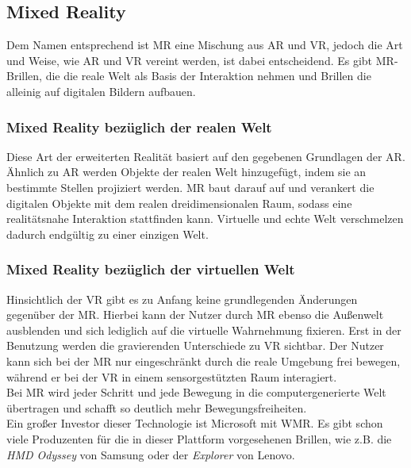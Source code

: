 \subsection*{Mixed Reality}
Dem Namen entsprechend ist \ac{MR} eine Mischung aus \acl{AR} und \acl{VR}, jedoch die Art und Weise, wie \acs{AR} und \acs{VR} vereint 
werden, ist dabei entscheidend. Es gibt \acs{MR}-Brillen, die die reale Welt als Basis der Interaktion nehmen und Brillen die alleinig 
auf digitalen Bildern aufbauen. \cite{mr.2018o}
\subsubsection*{Mixed Reality bezüglich der realen Welt}
Diese Art der erweiterten Realität basiert auf den gegebenen Grundlagen der \acs{AR}. Ähnlich zu \acl{AR} werden Objekte der realen Welt 
hinzugefügt, indem sie an bestimmte Stellen projiziert werden. \acl{MR} baut darauf auf und verankert die digitalen Objekte mit dem realen
dreidimensionalen Raum, sodass eine realitätsnahe Interaktion stattfinden kann. Virtuelle und echte Welt verschmelzen dadurch endgültig zu 
einer einzigen Welt. 

\subsubsection*{Mixed Reality bezüglich der virtuellen Welt}
Hinsichtlich der \acs{VR} gibt es zu Anfang keine grundlegenden Änderungen gegenüber der \acs{MR}. Hierbei kann der Nutzer durch 
\acs{MR} ebenso die Außenwelt ausblenden und sich lediglich auf die virtuelle Wahrnehmung fixieren. Erst in der Benutzung werden die 
gravierenden Unterschiede zu \acs{VR} sichtbar. Der Nutzer kann sich bei der \acs{MR} nur eingeschränkt durch 
die reale Umgebung frei bewegen, während er bei der \acl{VR} in einem sensorgestützten Raum interagiert. \cite{vr.2018n}
\\ 
Bei \acs{MR} wird jeder Schritt und jede Bewegung in die computergenerierte Welt übertragen und schafft so deutlich mehr Bewegungsfreiheiten.
\\ 
\linebreak 
Ein großer Investor dieser Technologie ist Microsoft mit \ac{WMR}.
Es gibt schon viele Produzenten für die in dieser Plattform vorgesehenen Brillen, wie z.B. die \textit{HMD Odyssey} von Samsung oder der 
\textit{Explorer} von Lenovo.

